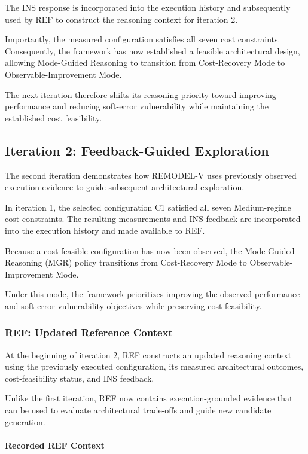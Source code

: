 The INS response is incorporated into
the execution history and subsequently
used by REF to construct the reasoning
context for iteration 2.

Importantly, the measured configuration
satisfies all seven cost constraints.
Consequently, the framework has now
established a feasible architectural
design, allowing Mode-Guided Reasoning
to transition from Cost-Recovery Mode
to Observable-Improvement Mode.

The next iteration therefore shifts
its reasoning priority toward improving
performance and reducing soft-error
vulnerability while maintaining the
established cost feasibility.


\subsection{Iteration 2: Feedback-Guided Exploration}
\label{app:illustrative_iteration2}

The second iteration demonstrates how REMODEL-V
uses previously observed execution evidence
to guide subsequent architectural exploration.

In iteration 1, the selected configuration C1
satisfied all seven Medium-regime cost constraints.
The resulting measurements and INS feedback
are incorporated into the execution history
and made available to REF.

Because a cost-feasible configuration has now
been observed, the Mode-Guided Reasoning (MGR)
policy transitions from Cost-Recovery Mode
to Observable-Improvement Mode.

Under this mode, the framework prioritizes
improving the observed performance and
soft-error vulnerability objectives while
preserving cost feasibility.

\subsubsection{REF: Updated Reference Context}
\label{app:illustrative_ref2}

At the beginning of iteration 2, REF constructs
an updated reasoning context using the previously
executed configuration, its measured architectural
outcomes, cost-feasibility status, and INS feedback.

Unlike the first iteration, REF now contains
execution-grounded evidence that can be used
to evaluate architectural trade-offs and
guide new candidate generation.

\paragraph{Recorded REF Context}

